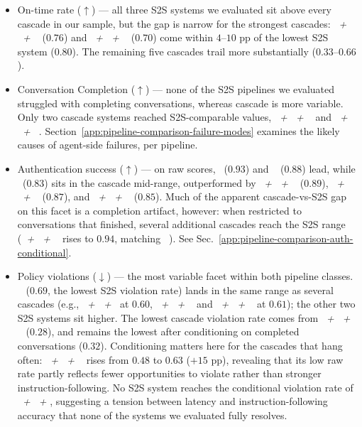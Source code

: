 \begin{itemize}
    \item On-time rate ($\uparrow$) --- all three S2S systems we evaluated sit above every cascade in our sample, but the gap is narrow for the strongest cascades: \emph{\whisperfull~+ \qwenfull~+ \voxtralfull~} ($0.76$) and \emph{\coherefull~+ \gemmaAfull~+ \voxtralfull~} ($0.70$) come within $4$--$10$ pp of the lowest S2S system ($0.80$). The remaining five cascades trail more substantially ($0.33$--$0.66$).
    \item Conversation Completion ($\uparrow$) --- none of the S2S pipelines we evaluated struggled with completing conversations, whereas cascade is more variable. Only two cascade systems reached S2S-comparable values, \emph{\scribefull~+ \geminiflashfull~+ \conversationalfull~} and \emph{\parakeetfull~+ \gemmaBfull~+ \kokorofull~}. Section~\ref{app:pipeline-comparison-failure-modes} examines the likely causes of agent-side failures, per pipeline.
    \item Authentication success ($\uparrow$) --- on raw scores, \emph{\gptrealtimefull~}($0.93$) and \emph{\geminilivefull~} ($0.88$) lead, while \emph{\gptrealtimeminifull~}($0.83$) sits in the cascade mid-range, outperformed by \emph{\scribefull~+ \geminiflashfull~+ \conversationalfull~} ($0.89$), \emph{\parakeetfull~+ \gemmaBfull~+ \kokorofull~} ($0.87$), and \emph{\novafull~+ \gptfull~+ \sonicfull~} ($0.85$). Much of the apparent cascade-vs-S2S gap on this facet is a completion artifact, however: when restricted to conversations that finished, several additional cascades reach the S2S range (\emph{\novafull~+ \gptfull~+ \sonicfull~} rises to $0.94$, matching \emph{\gptrealtimefull~}). See Sec.~\ref{app:pipeline-comparison-auth-conditional}.
    \item Policy violations ($\downarrow$) — the most variable facet within both pipeline classes. \emph{\gptrealtimefull~} ($0.69$, the lowest S2S violation rate) lands in the same range as several cascades (e.g., \emph{\coherefull~+ \gemmaAfull~+ \voxtralfull~}at $0.60$, \emph{\scribefull~+ \geminiflashfull~+ \conversationalfull~} and \emph{\parakeetfull~+ \gemmaBfull~+ \kokorofull~} at $0.61$); the other two S2S systems sit higher. The lowest cascade violation rate comes from \emph{\novafull~+ \gptfull~+ \sonicfull~} ($0.28$), and remains the lowest after conditioning on completed conversations ($0.32$). Conditioning matters here for the cascades that hang often: \emph{\inkfull~+ \haikufull~+ \sonicfull~} rises from $0.48$ to $0.63$ ($+15$ pp), revealing that its low raw rate partly reflects fewer opportunities to violate rather than stronger instruction-following. No S2S system reaches the conditional violation rate of \emph{\novafull~+ \gptfull~+ \sonicfull}, suggesting a tension between latency and instruction-following accuracy that none of the systems we evaluated fully resolves.
\end{itemize}

